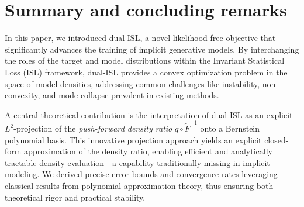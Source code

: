 \documentclass{article}
\begin{document}


\section{Summary and concluding remarks}

In this paper, we introduced dual-ISL, a novel likelihood-free objective that significantly advances the training of implicit generative models. By interchanging the roles of the target and model distributions within the Invariant Statistical Loss (ISL) framework, dual-ISL provides a convex optimization problem in the space of model densities, addressing common challenges like instability, non-convexity, and mode collapse prevalent in existing methods.

A central theoretical contribution is the interpretation of dual-ISL as an explicit \(L^2\)-projection of the \emph{push-forward density ratio} $q \circ \tilde{F}^{-1}$ onto a Bernstein polynomial basis. This innovative projection approach yields an explicit closed-form approximation of the density ratio, enabling efficient and analytically tractable density evaluation—a capability traditionally missing in implicit modeling. We derived precise error bounds and convergence rates leveraging classical results from polynomial approximation theory, thus ensuring both theoretical rigor and practical stability.
\end{document}
